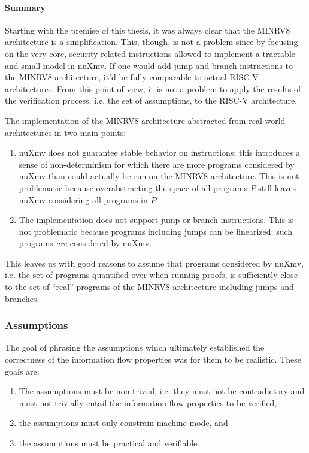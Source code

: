 \paragraph{Summary}

Starting with the premise of this thesis, it was always clear that the MINRV8 architecture is a simplification.
This, though, is not a problem since by focusing on the very core, security related instructions allowed to implement a tractable and small model in nuXmv.
If one would add jump and branch instructions to the MINRV8 architecture, it'd be fully comparable to actual RISC-V architectures.
From this point of view, it is not a problem to apply the results of the verification process, i.e. the set of assumptions, to the RISC-V architecture.

The implementation of the MINRV8 architecture abstracted from real-world architectures in two main points:
\begin{enumerate}
    \item nuXmv does not guarantee stable behavior on  instructions; this introduces a sense of non-determinism for which there are more programs considered by nuXmv than could actually be run on the MINRV8 architecture.
    This is not problematic because overabstracting the space of all programs $ P $ still leaves nuXmv considering all programs in $ P $.
    \item The implementation does not support jump or branch instructions.
    This is not problematic because programs including jumps can be linearized; such programs \textit{are} considered by nuXmv.
\end{enumerate}

This leaves us with good reasons to assume that programs considered by nuXmv, i.e. the set of programs quantified over when running proofs, is sufficiently close to the set of \enquote{real} programs of the MINRV8 architecture including jumps and branches.

\subsubsection{Assumptions}


The goal of phrasing the assumptions which ultimately established the correctness of the information flow properties was for them to be realistic.
These goals are:
\begin{enumerate}
    \item \label{itm:assumptions-non-trivial}
    The assumptions must be non-trivial, i.e. they must not be contradictory and must not trivially entail the information flow properties to be verified,
    \item \label{itm:assumptions-machine-mode}
    the assumptions must only constrain machine-mode, and
    \item \label{itm:assumptions-verifiable}
    the assumptions must be practical and verifiable.
\end{enumerate}

